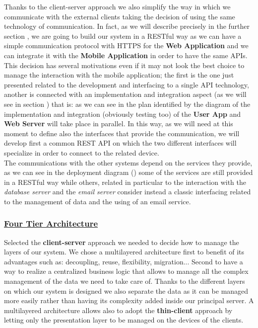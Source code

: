 			Thanks to the client-server approach we also simplify the way in which we communicate with the external clients taking the decision of using the same technology of communication. In fact, as we will describe precisely in the further section , we are going to build our system in a RESTful way as we can have a simple communication protocol with HTTPS for the \textbf{Web Application} and we can integrate it with the \textbf{Mobile Application} in order to have the same APIs. This decision has several motivations even if it may not look the best choice to manage the interaction with the mobile application; the first is the one just presented related to the development and interfacing to a single API technology, another is connected with an implementation and integration aspect (as we will see in section ) that is: as we can see in the plan identified by the diagram of  the implementation and integration (obviously testing too) of the \textbf{User App} and \textbf{Web Server} will take place in parallel. In this way, as we will need at this moment to define also the interfaces that provide the communication, we will develop first a common REST API on which the two different interfaces will specialize in order to connect to the related device.\\
			
			 The communications with the other systems depend on the services they provide, as we can see in the deployment diagram () some of the services are still provided in a RESTful way while others, related in particular to the interaction with the \emph{database server} and the \emph{email server} consider instead a classic interfacing related to the management of data and the using of an email service.
			
		\subsubsection[Four Tier Architecture]{\hyperlink{toc}{Four Tier Architecture}}
			\label{sec:fourTierArchitectureDecision}
			
			Selected the \textbf{client-server} approach we needed to decide how to manage the layers of our system. We chose a multilayered architecture first to benefit of its advantages such as: decoupling, reuse, flexibility, migration... Second to have a way to realize a centralized business logic that allows to manage all the complex management of the data we need to take care of. Thanks to the different layers on which our system is designed we also separate the data as it can be managed more easily rather than having its complexity added inside our principal server. A multilayered architecture allows also to adopt the \textbf{thin-client} approach by letting only the presentation layer to be managed on the devices of the clients.\\
			
